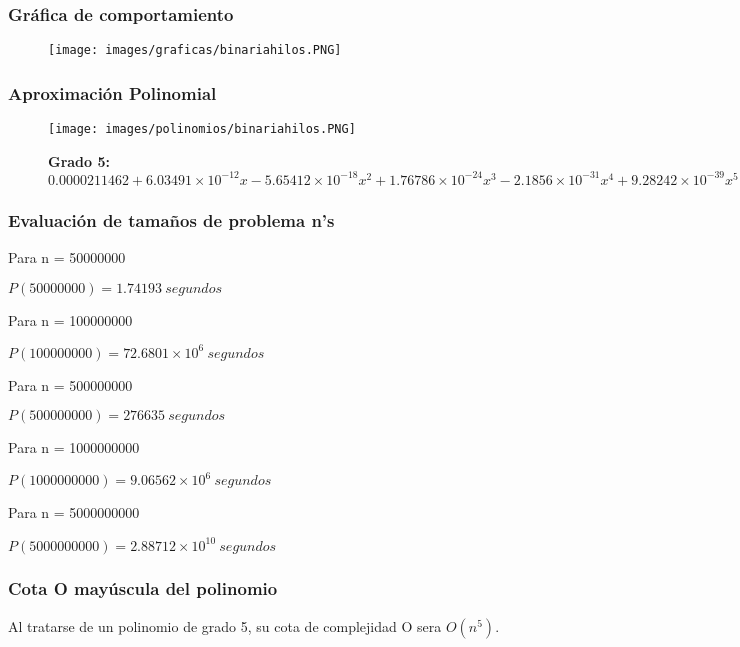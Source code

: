 \documentclass[12pt]{article}
\begin{document}
			\subsubsection{Gráfica de comportamiento}
				\begin{figure}[H]
			    	   \centering
			    	   \texttt{[image: images/graficas/binariahilos.PNG]}
			    \end{figure}
			
			\subsubsection{Aproximación Polinomial}
				\begin{figure}[H]
			    	   \centering
			    	   \texttt{[image: images/polinomios/binariahilos.PNG]}
			    	   \caption*{\textbf{Grado 5: $0.0000211462 + 6.03491\times10^{-12} x - 5.65412\times10^{-18} x^2 + 
                        1.76786\times10^{-24} x^3 - 2.1856\times10^{-31} x^4 + 9.28242\times10^{-39} x^5$}}
			    \end{figure}
			
			\subsubsection{Evaluación de tamaños de problema n's}
    			Para n = 50000000
    			
                $P(50000000) = 1.74193~ segundos$
    
    			Para n = 100000000
    			
    			$P(100000000) = 72.6801\times10^{6}~ segundos$
    			
    			Para n = 500000000
    			
    			$P(500000000) = 276635~ segundos$
    			
    			Para n = 1000000000
    			
    			$P(1000000000) = 9.06562\times10^6~ segundos$
    			
    			Para n = 5000000000
    			
    			$P(5000000000) = 2.88712\times10^{10}~ segundos$

			\subsubsection{Cota O mayúscula del polinomio}
			    Al tratarse de un polinomio de grado 5, su cota de complejidad O sera \textbf{$O(n^5)$}.
		
\newpage
\end{document}
